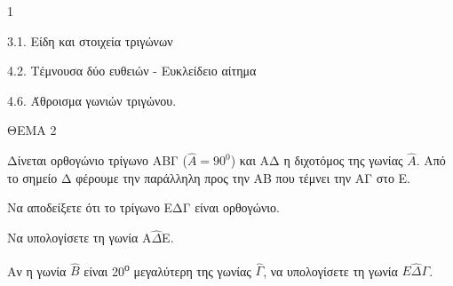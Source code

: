 \begin{ylh}{1}
    \item 3.1. Είδη και στοιχεία τριγώνων
    \item 4.2. Τέμνουσα δύο ευθειών - Ευκλείδειο αίτημα
    \item 4.6. Άθροισμα γωνιών τριγώνου.
\end{ylh}

ΘΕΜΑ 2

Δίνεται ορθογώνιο τρίγωνο ΑΒΓ ($\widehat{Α} = 90^{0}$) και ΑΔ η διχοτόμος της γωνίας $\widehat{Α}$. Από το σημείο Δ φέρουμε την παράλληλη προς την ΑΒ που τέμνει την ΑΓ στο Ε.

\begin{alist}
\item Να αποδείξετε ότι το τρίγωνο ΕΔΓ είναι ορθογώνιο. 

\item Να υπολογίσετε τη γωνία Α$\widehat{\Delta}$Ε. 

\item Αν η γωνία $\widehat{Β}$ είναι 20\textsuperscript{ο} μεγαλύτερη της γωνίας $\widehat{\Gamma}$, να υπολογίσετε τη γωνία $Ε\widehat{\Delta}\Gamma$.

\end{alist}
